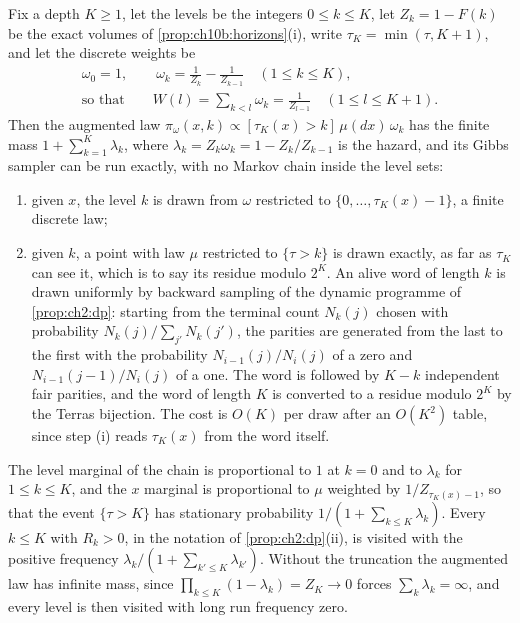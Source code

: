 \begin{theorem}\label{thm:ch10b:perfect}
Fix a depth $K\ge1$, let the levels be the integers $0\le k\le K$, let $Z_k=1-F(k)$ be the exact volumes
of \cref{prop:ch10b:horizons}(i), write $\tau_K=\min(\tau,K+1)$, and let the discrete weights be
\begin{gather*}
  \omega_0=1,\qquad \omega_k=\frac1{Z_k}-\frac1{Z_{k-1}}\quad(1\le k\le K),\\
  \text{so that}\qquad W(l)=\sum_{k<l}\omega_k=\frac1{Z_{l-1}}\quad(1\le l\le K+1) .
\end{gather*}
Then the augmented law
$\pi_\omega(x,k)\propto[\tau_K(x)>k]\,\mu(dx)\,\omega_k$ has the finite mass $1+\sum_{k=1}^K\lambda_k$, where $\lambda_k=Z_k\omega_k=1-Z_k/Z_{k-1}$ is the hazard, and its Gibbs sampler can be run exactly, with
no Markov chain inside the level sets:
\begin{enumerate}[label=(\roman*),leftmargin=2em]
\item given $x$, the level $k$ is drawn from $\omega$ restricted to
  $\{0,\dots,\tau_K(x)-1\}$, a finite discrete law;
\item given $k$, a point with law $\mu$ restricted to $\{\tau>k\}$ is drawn exactly, as far as $\tau_K$ can see it, which is to say its residue modulo $2^K$. An alive word of length $k$ is drawn uniformly by
  backward sampling of the dynamic programme of \cref{prop:ch2:dp}: starting
  from the terminal count $N_k(j)$ chosen with probability
  $N_k(j)/\sum_{j'}N_k(j')$, the parities are generated from the last to the
  first with the probability $N_{i-1}(j)/N_i(j)$ of a zero and
  $N_{i-1}(j-1)/N_i(j)$ of a one. The word is followed by $K-k$ independent fair parities, and the word of length $K$ is converted to a residue modulo $2^K$ by the Terras bijection. The cost is $O(K)$ per draw after an $O(K^2)$ table, since step (i) reads $\tau_K(x)$ from the word itself.
\end{enumerate}
The level marginal of the chain is proportional to $1$ at $k=0$ and to $\lambda_k$ for $1\le k\le K$, and the
$x$ marginal is proportional to $\mu$ weighted by $1/Z_{\tau_K(x)-1}$, so that the event $\{\tau>K\}$ has stationary probability $1/(1+\sum_{k\le K}\lambda_k)$. Every $k\le K$ with
$R_k>0$, in the notation of \cref{prop:ch2:dp}(ii), is visited with the positive frequency $\lambda_k/(1+\sum_{k'\le K}\lambda_{k'})$. Without the truncation the augmented law has infinite mass, since $\prod_{k\le K}(1-\lambda_k)=Z_K\to0$ forces $\sum_k\lambda_k=\infty$, and every level is then visited with long run frequency zero.
\end{theorem}

